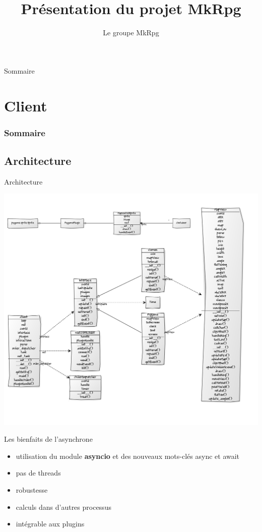 \documentclass[11pt]{beamer}
\author{Le groupe MkRpg}
\title{Présentation du projet MkRpg}
\begin{document}
\begin{frame}
\titlepage
\end{frame}

\begin{frame}{Sommaire}
\tableofcontents
\end{frame}




\section{Client}
    \begin{frame}
        \frametitle{Sommaire}
        \tableofcontents[currentsection]
    \end{frame}

\subsection{Architecture}
\begin{frame}{Architecture}
	\begin{center}\includegraphics[scale=0.21]{uml_pygame.png}\end{center}
\end{frame}

\begin{frame}{Les bienfaits de l'asynchrone}
\begin{itemize}
\item utilisation du module \textbf{asyncio} et des nouveaux mots-clés async et await
\item pas de threads
\item robustesse
\item calculs dans d'autres processus
\item intégrable aux plugins
\end{itemize}
\end{frame}
\end{document}
